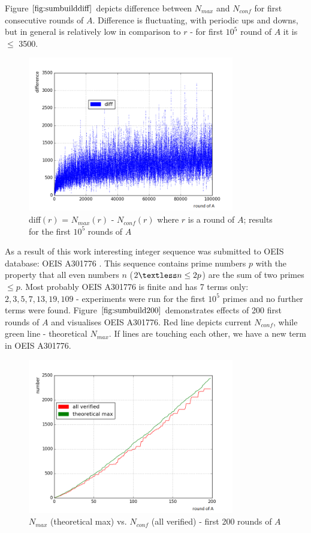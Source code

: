 \documentclass[10pt,twocolumn]{article}
\begin{document}
Figure $\ref{fig:sumbuilddiff}$ depicts difference between $N_{max}$ and $N_{conf}$ for first consecutive rounds of $A$. Difference is fluctuating, with periodic ups and downs, but in general is relatively low in comparison to $r$ - for first $10^5$ round of $A$ it is $\leq$ 3500.

\begin{figure}[!ht]
\centering
\captionsetup{justification=centering}
\includegraphics[width=9cm]{f_sumbuild_diff}
\caption[caption]{diff$(r)$ = $N_{max}(r)$ - $N_{conf}(r)$ where $r$ is a round of $A$; results for the first $10^5$ rounds of $A$}
\label{fig:sumbuilddiff}
\end{figure}

As a result of this work interesting integer sequence was submitted to OEIS database: OEIS A301776 \cite{A301776}. This sequence contains prime numbers $p$ with the property that all even numbers $n$ ($2 \textless n \leq 2p$) are the sum of two primes $\leq p$. Most probably OEIS A301776 is finite and has 7 terms only: $2, 3, 5, 7, 13, 19, 109$ - experiments were run for the first $10^5$  primes and no further terms were found. Figure $\ref{fig:sumbuild200}$ demonstrates effects of 200 first rounds of $A$ and visualises OEIS A301776. Red line depicts current $N_{conf}$, while green line - theoretical $N_{max}$. If lines are touching each other, we have a new term in OEIS A301776. \par

\begin{figure}[!ht]
\centering
\captionsetup{justification=centering}
\includegraphics[width=9cm]{f_sumbuild_effectiveness_200}
\caption[caption]{$N_{max}$ (theoretical max) vs. $N_{conf}$ (all verified) - first 200 rounds of $A$}
\label{fig:sumbuild200}
\end{figure}
\end{document}
